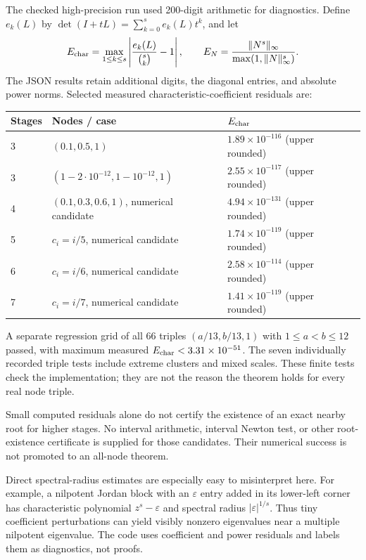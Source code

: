 \documentclass[11pt]{article}
\theoremstyle{remark}
\begin{document}
The checked high-precision run used 200-digit arithmetic for diagnostics. Define
$e_k(L)$ by $\det(I+tL)=\sum_{k=0}^s e_k(L)t^k$, and let
\begin{equation}\label{eq:err}
 E_{\rm char}=\max_{1\leq k\leq s}
       \left|\frac{e_k(L)}{\binom sk}-1\right|,\qquad
 E_N=\frac{\|N^s\|_\infty}{\max(1,\|N\|_\infty^s)}.
\end{equation}
The JSON results retain additional digits, the diagonal entries, and absolute
power norms. Selected measured characteristic-coefficient residuals are:
\begin{center}
\begin{tabular}{@{}lll@{}}
\toprule
Stages & Nodes / case & $E_{\rm char}$ \\
\midrule
3 & $(0.1,0.5,1)$ & $1.89\times10^{-116}$ (upper rounded) \\
3 & $(1-2\cdot10^{-12},1-10^{-12},1)$ & $2.55\times10^{-117}$ (upper rounded) \\
4 & $(0.1,0.3,0.6,1)$, numerical candidate & $4.94\times10^{-131}$ (upper rounded) \\
5 & $c_i=i/5$, numerical candidate & $1.74\times10^{-119}$ (upper rounded) \\
6 & $c_i=i/6$, numerical candidate & $2.58\times10^{-114}$ (upper rounded) \\
7 & $c_i=i/7$, numerical candidate & $1.41\times10^{-119}$ (upper rounded) \\
\bottomrule
\end{tabular}
\end{center}
A separate regression grid of all 66 triples $(a/13,b/13,1)$ with
$1\leq a<b\leq12$ passed, with maximum measured $E_{\rm char}<3.31\times10^{-51}$.
The seven individually recorded triple tests include extreme clusters and mixed
scales. These finite tests check the implementation; they are not the reason
the theorem holds for every real node triple.

Small computed residuals alone do not certify the existence of an exact nearby
root for higher stages. No interval arithmetic, interval Newton test, or other
root-existence certificate is supplied for those candidates. Their numerical
success is not promoted to an all-node theorem.

Direct spectral-radius estimates are especially easy to misinterpret here.
For example, a nilpotent Jordan block with an $\varepsilon$ entry added in its
lower-left corner has characteristic polynomial $z^s-\varepsilon$ and spectral
radius $|\varepsilon|^{1/s}$. Thus tiny coefficient perturbations can yield
visibly nonzero eigenvalues near a multiple nilpotent eigenvalue. The code uses
coefficient and power residuals and labels them as diagnostics, not proofs.
\end{document}

